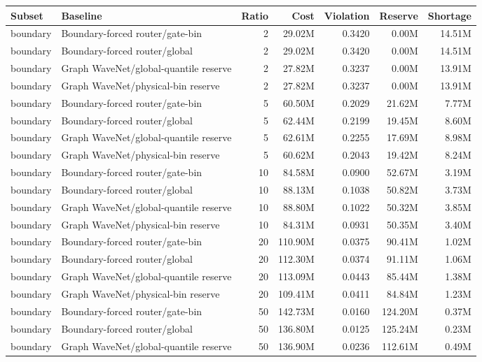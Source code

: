 \begin{tabular}{llrrrrr}
\toprule
Subset & Baseline & Ratio & Cost & Violation & Reserve & Shortage \\
\midrule
boundary & Boundary-forced router/gate-bin & 2 & 29.02M & 0.3420 & 0.00M & 14.51M \\
boundary & Boundary-forced router/global & 2 & 29.02M & 0.3420 & 0.00M & 14.51M \\
boundary & Graph WaveNet/global-quantile reserve & 2 & 27.82M & 0.3237 & 0.00M & 13.91M \\
boundary & Graph WaveNet/physical-bin reserve & 2 & 27.82M & 0.3237 & 0.00M & 13.91M \\
boundary & Boundary-forced router/gate-bin & 5 & 60.50M & 0.2029 & 21.62M & 7.77M \\
boundary & Boundary-forced router/global & 5 & 62.44M & 0.2199 & 19.45M & 8.60M \\
boundary & Graph WaveNet/global-quantile reserve & 5 & 62.61M & 0.2255 & 17.69M & 8.98M \\
boundary & Graph WaveNet/physical-bin reserve & 5 & 60.62M & 0.2043 & 19.42M & 8.24M \\
boundary & Boundary-forced router/gate-bin & 10 & 84.58M & 0.0900 & 52.67M & 3.19M \\
boundary & Boundary-forced router/global & 10 & 88.13M & 0.1038 & 50.82M & 3.73M \\
boundary & Graph WaveNet/global-quantile reserve & 10 & 88.80M & 0.1022 & 50.32M & 3.85M \\
boundary & Graph WaveNet/physical-bin reserve & 10 & 84.31M & 0.0931 & 50.35M & 3.40M \\
boundary & Boundary-forced router/gate-bin & 20 & 110.90M & 0.0375 & 90.41M & 1.02M \\
boundary & Boundary-forced router/global & 20 & 112.30M & 0.0374 & 91.11M & 1.06M \\
boundary & Graph WaveNet/global-quantile reserve & 20 & 113.09M & 0.0443 & 85.44M & 1.38M \\
boundary & Graph WaveNet/physical-bin reserve & 20 & 109.41M & 0.0411 & 84.84M & 1.23M \\
boundary & Boundary-forced router/gate-bin & 50 & 142.73M & 0.0160 & 124.20M & 0.37M \\
boundary & Boundary-forced router/global & 50 & 136.80M & 0.0125 & 125.24M & 0.23M \\
boundary & Graph WaveNet/global-quantile reserve & 50 & 136.90M & 0.0236 & 112.61M & 0.49M \\

\end{tabular}
